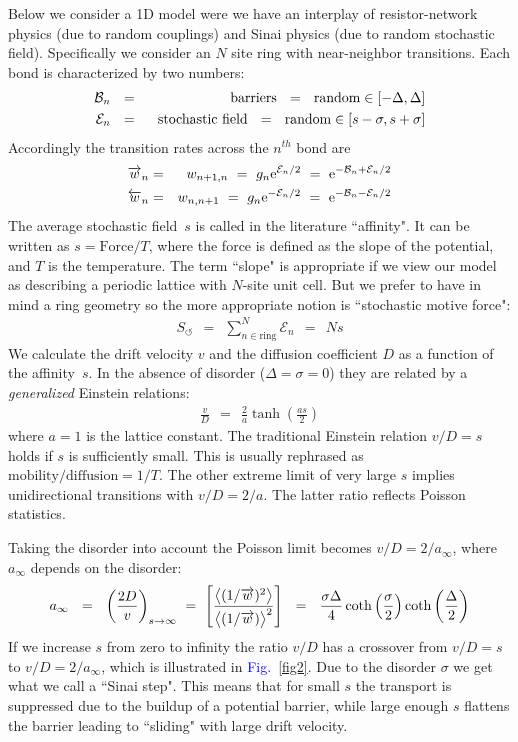 \documentclass[aps,pre,floats,floatfix,fleqn,notitlepage]{revtex4-1}
\newcommand{\eexp}{\mbox{e}^}
\newcommand{\mylabel}[1]{\label{#1}}  %
\newcommand{\beq}{\begin{eqnarray}}
\newcommand{\eeq}{\end{eqnarray}}
\newcommand{\be}[1]{\begin{eqnarray}\ifthenelse{#1=-1}{\nonumber}{\ifthenelse{#1=0}{}{\mylabel{e#1}}}}
\newcommand{\ee}{\end{eqnarray}}
\newcommand{\Fig}[1] {\textcolor{blue}{Fig.~\ref{#1}}} %
\newcommand{\ola}{\protect\overleftarrow}
\newcommand{\ora}{\protect\overrightarrow}
\begin{document}
Below we consider a 1D model were we have an interplay of resistor-network physics 
(due to random couplings) and Sinai physics (due to random stochastic field).       
Specifically we consider an $N$ site ring with near-neighbor transitions.
Each bond is characterized by two numbers:
%
\be{1}
\mathcal{B}_n \ \ &=& \ \ \text{barriers} \ \ = \ \ \text{random} \in [-\Delta,\Delta] \\
\mathcal{E}_n \ \ &=& \ \ \text{stochastic field} \ \ = \ \ \text{random} \in [s-\sigma,s+\sigma] 
\ee
%
Accordingly the transition rates across the $n^{th}$ bond are 
%
\be{1}
\ora{w}_{n} &=&  w_{n+1,n} \ = \ g_n \eexp{ \mathcal{E}_n/2} \ = \ \eexp{-\mathcal{B}_n + \mathcal{E}_n/2} \\
\ola{w}_{n} &=&  w_{n,n+1} \ = \ g_n \eexp{-\mathcal{E}_n/2} \ = \ \eexp{-\mathcal{B}_n - \mathcal{E}_n/2}
\ee
%
The average stochastic field~$s$ is called in the literature ``affinity". 
It can be written as $s=\text{Force}/T$, where the force 
is defined as the slope of the potential, and $T$ is the temperature.
The term ``slope" is appropriate if we view our model as describing 
a periodic lattice with $N$-site unit cell. But we prefer to have in 
mind a ring geometry so the more appropriate notion is ``stochastic motive force":
%
\beq
S_{\circlearrowleft} \ \ = \ \ \sum_{n\in\text{ring}}^N \mathcal{E}_{n} \ \ = \ \ Ns
\eeq  
%
We calculate the drift velocity $v$ and the diffusion coefficient $D$ as a function of the affinity~$s$. 
In the absence of disorder ($\Delta=\sigma=0$) they are related by a {\em generalized} Einstein relations:
%
\beq
\frac{v}{D} \ \ = \ \ \frac{2}{a}\tanh\left(\frac{as}{2}\right)
\eeq
%
where $a=1$ is the lattice constant. 
The traditional Einstein relation $v/D=s$ holds if $s$ is sufficiently small. 
This is usually rephrased as $\text{mobility}/\text{diffusion} = 1/T$.  
The other extreme limit of very large $s$ implies 
unidirectional transitions with $v/D=2/a$. 
The latter ratio reflects Poisson statistics.   
      
Taking the disorder into account the Poisson limit becomes  $v/D=2/a_{\infty}$, 
where $a_{\infty}$ depends on the disorder:
%
%
\be{4}
a_{\infty} \ \ = \ \  \left(\frac{2D}{v}\right)_{s\rightarrow\infty} \ = \ 
\left[\frac{\big\langle (1/\ora{w})^2 \big\rangle}{\big\langle (1/\ora{w}) \big\rangle^2}\right]
\ \  = \  \ \frac{\sigma \Delta}{4} \coth\left( \frac{\sigma}{2} \right)\coth\left( \frac{\Delta}{2} \right)
\ee
%
If we increase $s$ from zero to infinity the ratio $v/D$ has 
a crossover from $v/D=s$ to $v/D=2/a_{\infty}$, which is illustrated in \Fig{fig2}.
Due to the disorder $\sigma$ we get what we call a ``Sinai step". 
This means that for small $s$ the transport is suppressed due to 
the buildup of a potential barrier, while large enough $s$ flattens 
the barrier leading to ``sliding" with large drift velocity.
\end{document}
